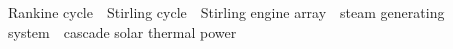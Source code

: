{%



}
\enkeywords
{Rankine cycle\ ~Stirling cycle\ ~Stirling engine array\ ~steam generating system\ ~cascade solar thermal power}
